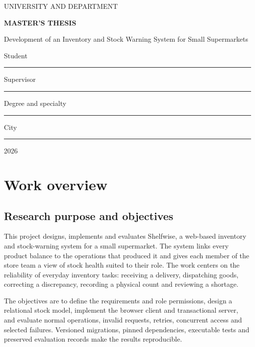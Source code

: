 \documentclass[12pt,a4paper,oneside]{report}
\begin{document}
\hypersetup{pageanchor=false}
\begin{titlepage}\centering
{\large UNIVERSITY AND DEPARTMENT\par}\vspace{2cm}
{\Large\bfseries MASTER'S THESIS\par}\vspace{1.7cm}
{\LARGE Development of an Inventory and Stock Warning System for Small Supermarkets\par}\vspace{2.4cm}
Student\quad\rule{7cm}{0.4pt}\par\vspace{0.7cm}
Supervisor\quad\rule{6.7cm}{0.4pt}\par\vspace{0.7cm}
Degree and specialty\quad\rule{5.5cm}{0.4pt}\par\vspace{0.7cm}
City\quad\rule{7.5cm}{0.4pt}\par\vfill 2026
\end{titlepage}
\hypersetup{pageanchor=true}
{\small\setlength{\parskip}{0pt}\tableofcontents}
\chapter*{Work overview}


\FloatBarrier

\section*{Research purpose and objectives}


This project designs, implements and evaluates Shelfwise, a web-based inventory and stock-warning system for a small supermarket. The system links every product balance to the operations that produced it and gives each member of the store team a view of stock health suited to their role. The work centers on the reliability of everyday inventory tasks: receiving a delivery, dispatching goods, correcting a discrepancy, recording a physical count and reviewing a shortage.


The objectives are to define the requirements and role permissions, design a relational stock model, implement the browser client and transactional server, and evaluate normal operations, invalid requests, retries, concurrent access and selected failures. Versioned migrations, pinned dependencies, executable tests and preserved evaluation records make the results reproducible.
\end{document}
